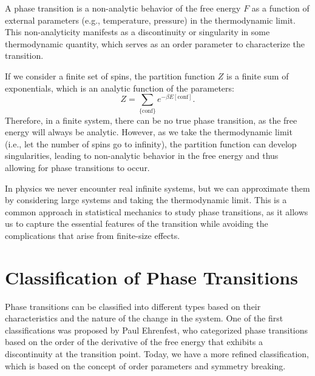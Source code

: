 \begin{definition}
    A phase transition is a non-analytic behavior of the free energy $F$ as a function of external parameters (e.g., temperature, pressure) in the thermodynamic limit. This non-analyticity manifests as a discontinuity or singularity in some thermodynamic quantity, which serves as an order parameter to characterize the transition.
\end{definition}

\begin{example}
    If we consider a finite set of spins, the partition function $Z$ is a finite sum of exponentials, which is an analytic function of the parameters:
    \[
        Z = \sum_{\{\text{conf}\}} e^{- \beta E[\text{conf}]}.
    \]
    Therefore, in a finite system, there can be no true phase transition, as the free energy will always be analytic. However, as we take the thermodynamic limit (i.e., let the number of spins go to infinity), the partition function can develop singularities, leading to non-analytic behavior in the free energy and thus allowing for phase transitions to occur.
\end{example}

In physics we never encounter real infinite systems, but we can approximate them by considering large systems and taking the thermodynamic limit. This is a common approach in statistical mechanics to study phase transitions, as it allows us to capture the essential features of the transition while avoiding the complications that arise from finite-size effects.

\section{Classification of Phase Transitions}

Phase transitions can be classified into different types based on their characteristics and the nature of the change in the system. One of the first classifications was proposed by Paul Ehrenfest, who categorized phase transitions based on the order of the derivative of the free energy that exhibits a discontinuity at the transition point. Today, we have a more refined classification, which is based on the concept of order parameters and symmetry breaking.


